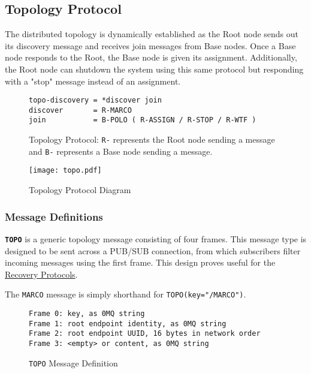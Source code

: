 \subsection{Topology Protocol}
\label{proto_topo}

The \dcamp distributed topology is dynamically established as the Root node sends out its discovery message and receives
join messages from Base nodes. Once a Base node responds to the Root, the Base node is given its assignment.
Additionally, the Root node can shutdown the system using this same protocol but responding with a "stop" message
instead of an assignment.

\begin{figure}[H]
\vspace{+10pt}
\begin{verbatim}
topo-discovery = *discover join
discover       = R-MARCO
join           = B-POLO ( R-ASSIGN / R-STOP / R-WTF )
\end{verbatim}
\vspace{-5pt}
\caption[Topology Protocol]
        {Topology Protocol: \texttt{R-} represents the Root node sending a message and \texttt{B-}
         represents a Base node sending a message.}
\label{fig:proto_topo_spec}
\end{figure}

\begin{figure}[H]
    \centering
    \texttt{[image: topo.pdf]}
    \label{fig:proto_topo_image}
    \caption{Topology Protocol Diagram}
\end{figure}

\subsubsection{Message Definitions}

\textbf{\texttt{TOPO}} is a generic topology message consisting of four frames. This message type is designed to be sent
across a PUB/SUB connection, from which subscribers filter incoming messages using the first frame. This design proves
useful for the \hyperref[proto_reco]{Recovery Protocols}.

The \texttt{MARCO} message is simply shorthand for \texttt{TOPO(key="/MARCO")}.

\begin{figure}[H]
\vspace{+10pt}
\begin{verbatim}
Frame 0: key, as 0MQ string
Frame 1: root endpoint identity, as 0MQ string
Frame 2: root endpoint UUID, 16 bytes in network order
Frame 3: <empty> or content, as 0MQ string
\end{verbatim}
\vspace{-20pt}
\caption{\texttt{TOPO} Message Definition}
\label{fig:message_topo}
\end{figure}

